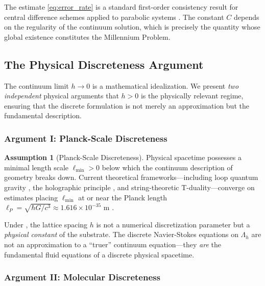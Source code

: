 \documentclass[12pt, a4paper]{article}
\theoremstyle{plain}
\theoremstyle{definition}
\newtheorem{assumption}[theorem]{Assumption}
\begin{document}
\begin{remark}
  The estimate \eqref{eq:error_rate} is a standard first-order consistency
  result for central difference schemes applied to parabolic systems
  \citep{LeVeque2007}. The constant $C$ depends on the regularity of the
  continuum solution, which is precisely the quantity whose global existence
  constitutes the Millennium Problem.
\end{remark}

\subsection{The Physical Discreteness Argument}\label{subsec:physical}

The continuum limit $h \to 0$ is a mathematical idealization. We present
\emph{two independent} physical arguments that $h > 0$ is the physically
relevant regime, ensuring that the discrete formulation is not merely an
approximation but the fundamental description.

\subsubsection{Argument I: Planck-Scale Discreteness}

\begin{assumption}[Planck-Scale Discreteness]\label{asm:planck}
  Physical spacetime possesses a minimal length scale $\ell_{\min} > 0$
  below which the continuum description of geometry breaks down. Current
  theoretical frameworks---including loop quantum gravity \citep{Rovelli2004},
  the holographic principle \citep{tHooft1993}, and string-theoretic
  T-duality---converge on estimates placing $\ell_{\min}$ at or near the
  Planck length $\ell_P = \sqrt{\hbar G / c^3} \approx 1.616 \times 10^{-35}$
  m \citep{Planck1899}.
\end{assumption}

Under , the lattice spacing $h$ is not a numerical
discretization parameter but a \emph{physical constant} of the substrate.
The discrete Navier-Stokes equations on $\Lambda_h$ are not an approximation
to a ``truer'' continuum equation---they \emph{are} the fundamental fluid
equations of a discrete physical spacetime.

\subsubsection{Argument II: Molecular Discreteness}
\end{document}
